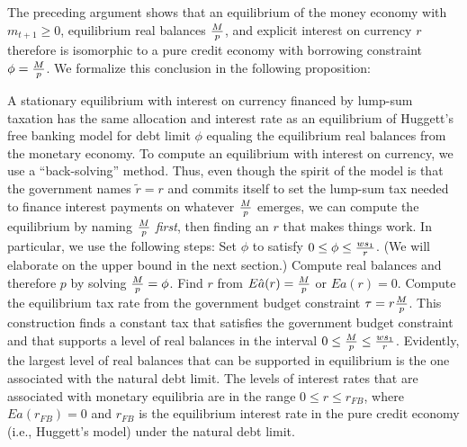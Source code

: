    The preceding argument shows that
an equilibrium  of the money economy with $m_{t+1} \geq 0$,
equilibrium real balances ${M \over p}$, and explicit
interest on currency $r$ therefore
is isomorphic to a pure credit economy
with borrowing constraint $\phi = {M \over p}$.
We formalize this conclusion in the following proposition:

\medskip
\medskip{}  A stationary equilibrium with  interest
on currency financed by lump-sum taxation
 has the same allocation and interest rate
as an equilibrium of Huggett's free banking model
for debt limit $\phi$ equaling the equilibrium real balances
from the monetary economy.
\medskip
{}
   To compute an equilibrium with interest on currency, we use
a ``back-solving'' method.
  Thus, even though the spirit of the model is that the government
names $\tilde r =r$ and commits itself to set the lump-sum tax
needed to finance interest payments on whatever ${M \over p}$
emerges, we can compute the equilibrium by naming ${M \over p}$
{\it first\/}, then finding an $r$ that makes things work.  In
particular, we use the following steps:%
\medskip
{} Set $\phi$ to satisfy $0 \leq \phi \leq {w s_1 \over r}$.
(We will elaborate on the upper bound in the next section.)
  Compute real balances and therefore $p$ by
solving  ${M \over p} = \phi$.
\medskip
{} Find $r$ from  $ E \hat a(r) = {M \over p} $ or $E a(r) = 0$.
\medskip
{} Compute the equilibrium tax rate from
the government budget constraint $\tau = r  {M\over p}  $.
\medskip
\noindent
This construction finds a constant tax
that satisfies  the government budget
constraint and that supports  a level  of
real balances in the interval $ 0 \leq    {M \over p} \leq {w s_1
\over r}$.  Evidently,  the largest level of real balances that
can be supported in equilibrium
is the one associated with the natural debt limit.    The levels
of interest rates that are associated with monetary equilibria
are in the range $0 \leq r \leq r_{FB}$,   where
$E a(r_{FB}) =0$ and $r_{FB}$ is the equilibrium  interest
rate in the pure credit economy (i.e., Huggett's model)
under the natural debt limit.

